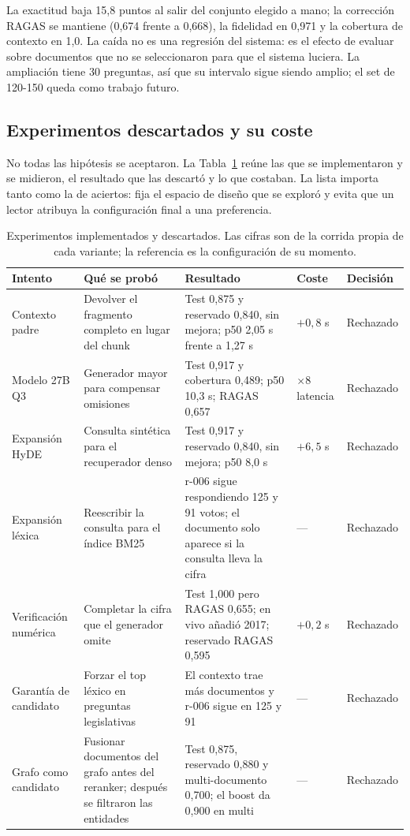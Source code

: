 La exactitud baja 15,8 puntos al salir del conjunto elegido a mano; la correcci\'on RAGAS se mantiene (0,674 frente a 0,668), la fidelidad en 0,971 y la cobertura de contexto en 1,0. La ca\'ida no es una regresi\'on del sistema: es el efecto de evaluar sobre documentos que no se seleccionaron para que el sistema luciera. La ampliaci\'on tiene 30 preguntas, as\'i que su intervalo sigue siendo amplio; el set de 120-150 queda como trabajo futuro.

\subsection{Experimentos descartados y su coste}
\label{sec:descartados}

No todas las hip\'otesis se aceptaron. La Tabla~\ref{tab:rechazados} re\'une las que se implementaron y se midieron, el resultado que las descart\'o y lo que costaban. La lista importa tanto como la de aciertos: fija el espacio de dise\~no que se explor\'o y evita que un lector atribuya la configuraci\'on final a una preferencia.

\begin{table}[t]
\centering
\footnotesize
\setlength{\tabcolsep}{4pt}
\caption{Experimentos implementados y descartados. Las cifras son de la corrida propia de cada variante; la referencia es la configuraci\'on de su momento.}
\label{tab:rechazados}
\begin{tabular}{@{}p{2.8cm}p{3.9cm}p{6.0cm}p{1.9cm}p{1.7cm}@{}}
\toprule
Intento & Qu\'e se prob\'o & Resultado & Coste & Decisi\'on \\
\midrule
Contexto padre & Devolver el fragmento completo en lugar del chunk & Test 0,875 y reservado 0,840, sin mejora; p50 2,05 s frente a 1,27 s & $+0{,}8$ s & Rechazado \\
Modelo 27B Q3 & Generador mayor para compensar omisiones & Test 0,917 y cobertura 0,489; p50 10,3 s; RAGAS 0,657 & $\times 8$ latencia & Rechazado \\
Expansi\'on HyDE & Consulta sint\'etica para el recuperador denso & Test 0,917 y reservado 0,840, sin mejora; p50 8,0 s & $+6{,}5$ s & Rechazado \\
Expansi\'on l\'exica & Reescribir la consulta para el \'indice BM25 & r-006 sigue respondiendo 125 y 91 votos; el documento solo aparece si la consulta lleva la cifra & --- & Rechazado \\
Verificaci\'on num\'erica & Completar la cifra que el generador omite & Test 1,000 pero RAGAS 0,655; en vivo a\~nadi\'o 2017; reservado RAGAS 0,595 & $+0{,}2$ s & Rechazado \\
Garant\'ia de candidato & Forzar el top l\'exico en preguntas legislativas & El contexto trae m\'as documentos y r-006 sigue en 125 y 91 & --- & Rechazado \\
Grafo como candidato & Fusionar documentos del grafo antes del reranker; despu\'es se filtraron las entidades & Test 0,875, reservado 0,880 y multi-documento 0,700; el boost da 0,900 en multi & --- & Rechazado \\
\bottomrule
\end{tabular}
\end{table}

